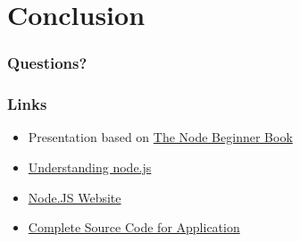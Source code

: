 \documentclass[ignorenonframetext,]{beamer}
\begin{document}
\section{Conclusion}

\begin{frame}\frametitle{Questions?}

\end{frame}

\begin{frame}\frametitle{Links}

\begin{itemize}
\item
  Presentation based on \href{http://www.nodebeginner.org/}{The Node
  Beginner Book}
\item
  \href{http://debuggable.com/posts/understanding-node-js:4bd98440-45e4-4a9a-8ef7-0f7ecbdd56cb}{Understanding
  node.js}
\item
  \href{http://nodejs.org}{Node.JS Website}
\item
  \href{http://github.com/ManuelKiessling/NodeBeginnerBook/tree/master/code/application}{Complete
  Source Code for Application}
\end{itemize}
\end{frame}
\end{document}
